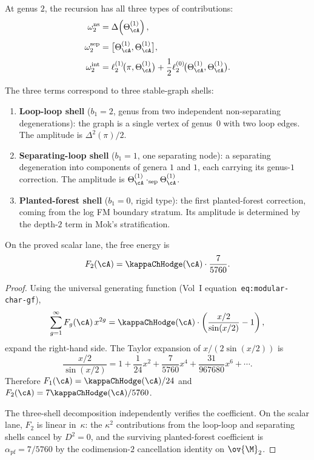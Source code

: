 \begin{computation}
\label{comp:genus-2-three-shell}
At genus $2$, the recursion has all three types of contributions:
\begin{align}
\omega_2^{\mathrm{ns}} &= \Delta\!\left(\Theta_\cA^{(1)}\right),
\\[3pt]
\omega_2^{\mathrm{sep}} &= \bigl[\Theta_\cA^{(1)}, \Theta_\cA^{(1)}\bigr],
\\[3pt]
\omega_2^{\mathrm{int}} &= \ell_2^{(1)}\!\bigl(\pi, \Theta_\cA^{(1)}\bigr)
 + \frac{1}{2}\ell_2^{(0)}\!\bigl(\Theta_\cA^{(1)}, \Theta_\cA^{(1)}\bigr).
\end{align}

The three terms correspond to three stable-graph shells:
\begin{enumerate}[label=\textup{(\alph*)}]
\item \textbf{Loop-loop shell} ($b_1 = 2$, genus from two independent
 non-separating degenerations): the graph is a single vertex of genus~$0$
 with two loop edges. The amplitude is $\Delta^2(\pi)/2$.
\item \textbf{Separating-loop shell} ($b_1 = 1$, one separating node): a separating
 degeneration into components of genera $1$ and $1$, each carrying its genus-$1$
 correction. The amplitude is $\Theta_\cA^{(1)} \cdot_{\mathrm{sep}} \Theta_\cA^{(1)}$.
\item \textbf{Planted-forest shell} ($b_1 = 0$, rigid type): the first planted-forest
 correction, coming from the log FM boundary stratum. Its amplitude is determined by
 the depth-$2$ term in Mok's stratification.
\end{enumerate}

On the proved scalar lane, the free energy is
\begin{equation}
F_2(\cA) = \kappaChHodge(\cA) \cdot \frac{7}{5760}.
\end{equation}
\end{computation}

\begin{proof}
Using the universal generating function (Vol~I equation~\texttt{eq:modular-char-gf}),
\[
\sum_{g=1}^{\infty} F_g(\cA)\, x^{2g}
= \kappaChHodge(\cA) \cdot
\left(\frac{x/2}{\sin(x/2)} - 1\right),
\]
expand the right-hand side. The Taylor expansion of $x/(2\sin(x/2))$ is
\[
\frac{x/2}{\sin(x/2)}
= 1 + \frac{1}{24}x^2 + \frac{7}{5760}x^4 + \frac{31}{967680}x^6 + \cdots.
\]
Therefore
$F_1(\cA)=\kappaChHodge(\cA)/24$ and
$F_2(\cA)=7\kappaChHodge(\cA)/5760$.

The three-shell decomposition independently verifies the coefficient.
On the scalar lane, $F_2$ is linear in~$\kappa$: the $\kappa^2$
contributions from the loop-loop and separating shells cancel by
$D^2 = 0$, and the surviving planted-forest coefficient is
$\alpha_{\mathrm{pf}} = 7/5760$ by the codimension-$2$
cancellation identity on $\ov{\M}_2$.
\end{proof}

